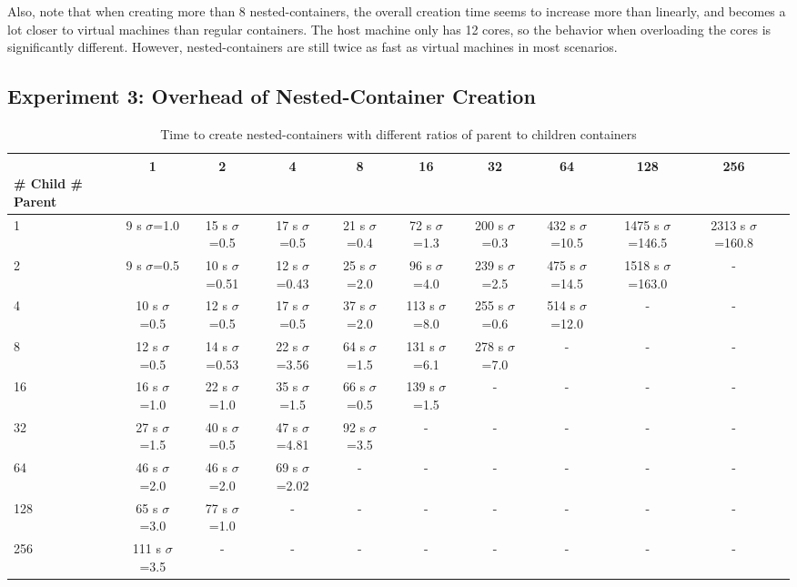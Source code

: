 \documentclass[conference]{IEEEtran}
\begin{document}
Also, note that when creating more than 8 nested-containers, the overall
creation time seems to increase more than linearly, and becomes a lot closer
to virtual machines than regular containers. The host machine only has 12
cores, so the behavior when overloading the cores is significantly different.
However, nested-containers are still twice as fast as virtual machines in most
scenarios.



\subsection{Experiment 3: Overhead of Nested-Container Creation}
\label{sub:exp3}

\begin{table*}
\renewcommand{\arraystretch}{1.3}
\centering
\caption {Time to create nested-containers with different ratios of parent
    to children containers}
\begin{tabular}{|l||c|c|c|c|c|c|c|c|c|c|}\hline
\diaghead{\theadfont Parenttttttttt Child}{\\ \# Child }{\# Parent}&1&  2                &	4          &	8                 &	16                &	32             &	64            &	128             &	256\\    \hline
\hline
1       &9  s $\sigma$=1.0&15 s $\sigma$=0.5 &17 s $\sigma$=0.5 &21 s $\sigma$=0.4 &72 s $\sigma$=1.3   &200 s $\sigma$=0.3 &432 s $\sigma$=10.5 &1475 s $\sigma$=146.5 &2313 s $\sigma$=160.8\\    \hline
2       &9  s $\sigma$=0.5&10 s $\sigma$=0.51&12 s $\sigma$=0.43&25 s $\sigma$=2.0 &96 s $\sigma$=4.0   &239 s $\sigma$=2.5 &475 s $\sigma$=14.5	&1518 s $\sigma$=163.0 &-	\\   \hline
4       &10 s $\sigma$=0.5&12 s $\sigma$=0.5 &17 s $\sigma$=0.5 &37 s $\sigma$=2.0 &113 s $\sigma$=8.0  &255 s $\sigma$=0.6 &514 s $\sigma$=12.0 &-		 &-  \\    \hline
8       &12 s $\sigma$=0.5&14 s $\sigma$=0.53&22 s $\sigma$=3.56&64 s $\sigma$=1.5 &131 s $\sigma$=6.1 &278 s $\sigma$=7.0 &-		&-	     &-  \\    \hline
16      &16 s $\sigma$=1.0&22 s $\sigma$=1.0 &35 s $\sigma$=1.5&66 s $\sigma$=0.5   &139 s $\sigma$=1.5&-	    &-	    &-		 &-  \\    \hline
32      &27 s $\sigma$=1.5&40 s $\sigma$=0.5 &47 s $\sigma$=4.81&92 s $\sigma$=3.5  & -		           &-	       &-	    &-	     &-  \\    \hline
64      &46 s $\sigma$=2.0&46 s $\sigma$=2.0 &69 s $\sigma$=2.02&-	                 &-		            &-	       &-	    &-	     &- \\    \hline
128     &65 s $\sigma$=3.0&77 s $\sigma$=1.0 &-      	          &-	             &-		            &-	    &-	       &-	     &-  \\    \hline
256     &111 s $\sigma$=3.5&-	            &-	                   &-	              &-		          &-	    &-	       &-	     &-   \\    \hline
\end{tabular}
\label{tab:creation-time-nested}
\end{table*}
\end{document}
